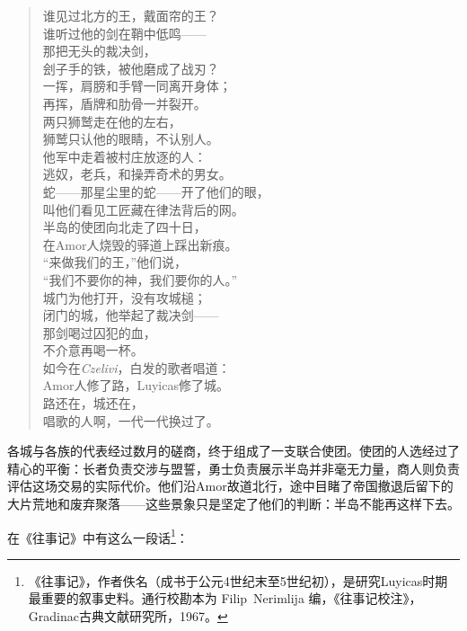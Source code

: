 {\small\kaishu
\begin{verse}
谁见过北方的王，戴面帘的王？ \\
谁听过他的剑在鞘中低鸣—— \\
那把无头的裁决剑， \\
刽子手的铁，被他磨成了战刃？ \\[4pt]

一挥，肩膀和手臂一同离开身体； \\
再挥，盾牌和肋骨一并裂开。 \\
两只狮鹫走在他的左右， \\
狮鹫只认他的眼睛，不认别人。 \\[4pt]

他军中走着被村庄放逐的人： \\
逃奴，老兵，和操弄奇术的男女。 \\
蛇——那星尘里的蛇——开了他们的眼， \\
叫他们看见工匠藏在律法背后的网。 \\[4pt]

半岛的使团向北走了四十日， \\
在Amor人烧毁的驿道上踩出新痕。 \\
``来做我们的王，''他们说， \\
``我们不要你的神，我们要你的人。'' \\[4pt]

城门为他打开，没有攻城槌； \\
闭门的城，他举起了裁决剑—— \\
那剑喝过囚犯的血， \\
不介意再喝一杯。 \\[4pt]

如今在\textit{Czelivi}，白发的歌者唱道： \\
Amor人修了路，Luyicas修了城。 \\
路还在，城还在， \\
唱歌的人啊，一代一代换过了。
\end{verse}}

各城与各族的代表经过数月的磋商，终于组成了一支联合使团。使团的人选经过了精心的平衡：长者负责交涉与盟誓，勇士负责展示半岛并非毫无力量，商人则负责评估这场交易的实际代价。他们沿Amor故道北行，途中目睹了帝国撤退后留下的大片荒地和废弃聚落——这些景象只是坚定了他们的判断：半岛不能再这样下去。

在《往事记》中有这么一段话\footnote{《往事记》，作者佚名（成书于公元4世纪末至5世纪初），是研究Luyicas时期最重要的叙事史料。通行校勘本为 Filip~Nerimlija 编，《往事记校注》，Gradinac古典文献研究所，1967。}：

